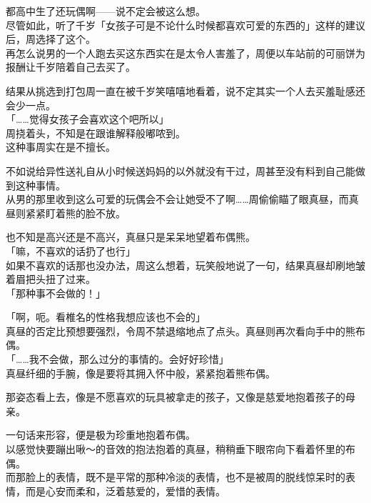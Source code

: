 都高中生了还玩偶啊——说不定会被这么想。\\

尽管如此，听了千岁「女孩子可是不论什么时候都喜欢可爱的东西的」这样的建议后，周选择了这个。\\

再怎么说男的一个人跑去买这东西实在是太令人害羞了，周便以车站前的可丽饼为报酬让千岁陪着自己去买了。

结果从挑选到打包周一直在被千岁笑嘻嘻地看着，说不定其实一个人去买羞耻感还会少一点。\\

「……觉得女孩子会喜欢这个吧所以」\\

周挠着头，不知是在跟谁解释般嘟哝到。\\

这种事周实在是不擅长。

不如说给异性送礼自从小时候送妈妈的以外就没有干过，周甚至没有料到自己能做到这种事情。\\

从男的那里收到这么可爱的玩偶会不会让她受不了啊……周偷偷瞄了眼真昼，而真昼则紧紧盯着熊的脸不放。

也不知是高兴还是不高兴，真昼只是呆呆地望着布偶熊。\\

「嘛，不喜欢的话扔了也行」\\

如果不喜欢的话那也没办法，周这么想着，玩笑般地说了一句，结果真昼却刷地皱着眉把头扭了过来。\\

「那种事不会做的！」

「啊，呃。看椎名的性格我想应该也不会的」\\

真昼的否定比预想要强烈，令周不禁退缩地点了点头。真昼则再次看向手中的熊布偶。\\

「……我不会做，那么过分的事情的。会好好珍惜」\\

真昼纤细的手腕，像是要将其拥入怀中般，紧紧抱着熊布偶。

那姿态看上去，像是不愿喜欢的玩具被拿走的孩子，又像是慈爱地抱着孩子的母亲。

一句话来形容，便是极为珍重地抱着布偶。\\

以感觉快要蹦出啾～的音效的抱法抱着的真昼，稍稍垂下眼帘向下看着怀里的布偶。\\

而那脸上的表情，既不是平常的那种冷淡的表情，也不是被周的脱线惊呆时的表情，而是心安而柔和，泛着慈爱的，爱惜的表情。

